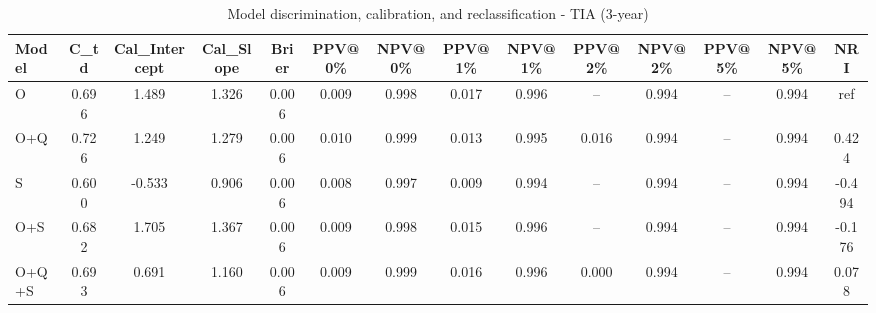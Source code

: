 \begin{table}[htbp]
\centering
\small
\caption{Model discrimination, calibration, and reclassification - TIA (3-year)}
\label{tab:perf_tia_3y}
\begin{tabular}{lccccccccccccc}
\toprule
Model & C\_td & Cal\_Intercept & Cal\_Slope & Brier & PPV@0\% & NPV@0\% & PPV@1\% & NPV@1\% & PPV@2\% & NPV@2\% & PPV@5\% & NPV@5\% & NRI \\
\midrule
O & 0.696 & 1.489 & 1.326 & 0.006 & 0.009 & 0.998 & 0.017 & 0.996 & -- & 0.994 & -- & 0.994 & ref \\
O+Q & 0.726 & 1.249 & 1.279 & 0.006 & 0.010 & 0.999 & 0.013 & 0.995 & 0.016 & 0.994 & -- & 0.994 & 0.424 \\
S & 0.600 & -0.533 & 0.906 & 0.006 & 0.008 & 0.997 & 0.009 & 0.994 & -- & 0.994 & -- & 0.994 & -0.494 \\
O+S & 0.682 & 1.705 & 1.367 & 0.006 & 0.009 & 0.998 & 0.015 & 0.996 & -- & 0.994 & -- & 0.994 & -0.176 \\
O+Q+S & 0.693 & 0.691 & 1.160 & 0.006 & 0.009 & 0.999 & 0.016 & 0.996 & 0.000 & 0.994 & -- & 0.994 & 0.078 \\
\bottomrule
\end{tabular}
\end{table}